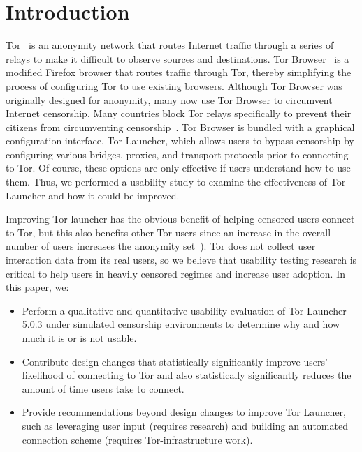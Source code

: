 \documentclass[USenglish,oneside,twocolumn]{article}
\begin{document}


\maketitle

\section{Introduction}
Tor~\cite{dingledine2004tor} is an anonymity network that routes Internet traffic through a series of relays 
to make it difficult to observe sources and destinations. Tor Browser~\cite{torbrowser} is a modified Firefox browser that routes traffic through Tor, thereby simplifying the process of configuring Tor to use existing browsers. Although Tor Browser was originally designed for anonymity, many now use Tor Browser to circumvent Internet censorship. Many countries block Tor relays specifically to prevent their citizens from circumventing censorship~\cite{winter2012great}. Tor Browser is bundled with a graphical configuration interface, Tor Launcher, which allows users to bypass censorship by configuring various bridges, proxies, and transport protocols prior to connecting to Tor. Of course, these options are only effective if users understand how to use them. Thus, we performed a usability study to examine the effectiveness of Tor Launcher and how it could be improved.

Improving Tor launcher has the obvious benefit of helping censored users connect to Tor, but this also benefits other Tor users since an increase in the overall number of users increases the anonymity set~\cite{dingledine2006anonymity}). Tor does not collect user interaction data from its real users, so we believe that usability testing research is critical to help users in heavily censored regimes and increase user adoption. In this paper, we: \\ 

\begin{itemize}
\item{Perform a qualitative and quantitative usability evaluation of Tor Launcher 5.0.3  under simulated censorship environments to determine why and how much it is or is not usable.}
\item{Contribute design changes that statistically significantly improve users' likelihood of connecting to Tor and also statistically significantly reduces the amount of time users take to connect.} 
\item{Provide recommendations beyond design changes to improve Tor Launcher, such as leveraging user input (requires research) and building an automated connection scheme (requires Tor-infrastructure work).}
\end{itemize} 
\end{document}
